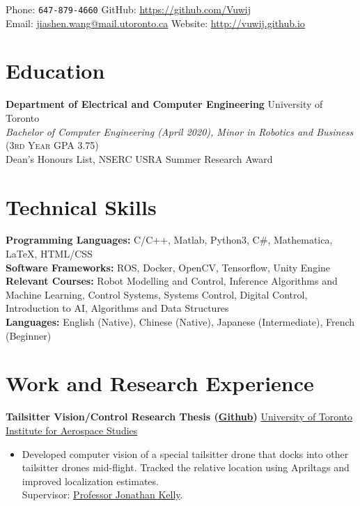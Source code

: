 \documentclass[10pt, a4paper]{cv}
\renewcommand*{\name}{\fontsize{24}{40}\mdseries\upshape}
\begin{document}
\begin{center}
\name{Jason Wang}
\end{center}

Phone: \texttt{647-879-4660} \hfill
GitHub: \href{https://github.com/Vuwij}{https://github.com/Vuwij}\\
Email: \href{mailto:jiashen.wang@mail.utoronto.ca}{jiashen.wang@mail.utoronto.ca}\hfill
Website: \href{http://vuwij.github.io}{http://vuwij.github.io}

\section*{Education}
\textbf{Department of Electrical and Computer Engineering} \hfill University of Toronto\\
\emph{Bachelor of Computer Engineering (April 2020), Minor in Robotics and Business} \small{\textsc{(3rd Year GPA 3.75)}}\\[0.1mm]
\small Dean's Honours List, NSERC USRA Summer Research Award

\section*{Technical Skills}
\textbf{Programming Languages:} C/C++, Matlab, Python3, C\#, Mathematica, \LaTeX, HTML/CSS\\[0.2em]
\textbf{Software Frameworks:} ROS, Docker, OpenCV, Tensorflow, Unity Engine\\[0.2em]
\textbf{Relevant Courses:} Robot Modelling and Control, Inference Algorithms and Machine Learning, Control Systems, Systems Control, Digital Control, Introduction to AI, Algorithms and Data Structures \\
\textbf{Languages:} English (Native), Chinese (Native), Japanese (Intermediate), French (Beginner)
\section*{Work and Research Experience}\noindent
	\textbf{Tailsitter Vision/Control Research Thesis (\href{https://github.com/utiasSTARS/hummingbird_ws}{Github})} \hfill \href{http://www.starslab.ca}{University of Toronto Institute for Aerospace Studies}
	\begin{itemize}
	\item Developed computer vision of a special tailsitter drone that docks into other tailsitter drones mid-flight. Tracked the relative location using Apriltags and improved localization estimates. \\Supervisor: \href{http://stars.utias.utoronto.ca/~jkelly/}{Professor Jonathan Kelly}.
	\end{itemize}
\end{document}
